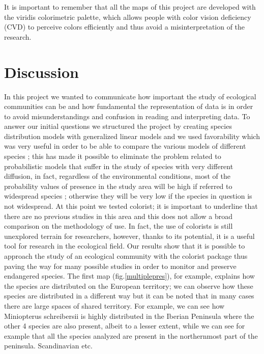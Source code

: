 \documentclass[12pt,a4paper]{article}
\begin{document}
It is important to remember that all the maps of this project are developed with the viridis colorimetric palette, which allows people with color vision deficiency (CVD) to perceive colors efficiently and thus avoid a misinterpretation of the research.

\restoregeometry
\newpage
\section{Discussion}
In this project we wanted to communicate how important the study of ecological communities can be and how fundamental the representation of data is in order to avoid misunderstandings and confusion in reading and interpreting data.
To answer our initial questions we structured the project by creating species distribution models with generalized linear models and we used favorability which was very useful in order to be able to compare the various models of different species \citep{fav}; this has made it possible to eliminate the problem related to probabilistic models that suffer in the study of species with very different diffusion, in fact, regardless of the environmental conditions, most of the probability values of presence in the study area will be high if referred to widespread species ; otherwise they will be very low if the species in question is not widespread. \citep{fav} \citep{avo}
At this point we tested colorist; it is important to underline that there are no previous studies in this area and this does not allow a broad comparison on the methodology of use. In fact, the use of colorists is still unexplored terrain for researchers, however, thanks to its potential, it is a useful tool for research in the ecological field.
Our results show that it is possible to approach the study of an ecological community with the colorist package thus paving the way for many possible studies in order to monitor and preserve endangered species.
The first map (fig.\ref{multiplepres}), for example, explains how the species are distributed on the European territory; we can observe how these species are distributed in a different way but it can be noted that in many cases there are large spaces of shared territory. For example, we can see how Miniopterus schreibersii is highly distributed in the Iberian Peninsula where the other 4 species are also present, albeit to a lesser extent, while we can see for example that all the species analyzed are present in the northernmost part of the peninsula. Scandinavian etc.
\end{document}
